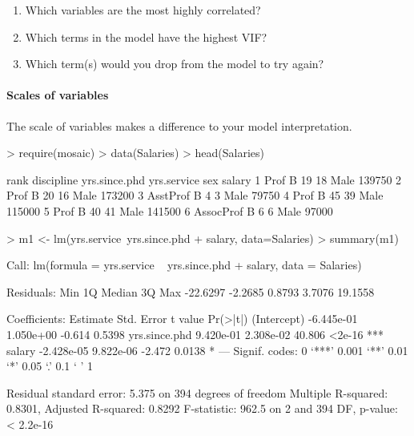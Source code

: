 \documentclass[10pt]{article}
\begin{document}
\begin{enumerate}
  \itemsep0.5in
  \item Which variables are the most highly correlated?
  \item Which terms in the model have the highest VIF?
  \item Which term(s) would you drop from the model to try again?
  \vspace{0.5in}
\end{enumerate}

\paragraph{Scales of variables}
The scale of variables makes a difference to your model interpretation. 

\begin{Schunk}
\begin{Sinput}
> require(mosaic)
> data(Salaries)
> head(Salaries)
\end{Sinput}
\begin{Soutput}
       rank discipline yrs.since.phd yrs.service  sex salary
1      Prof          B            19          18 Male 139750
2      Prof          B            20          16 Male 173200
3  AsstProf          B             4           3 Male  79750
4      Prof          B            45          39 Male 115000
5      Prof          B            40          41 Male 141500
6 AssocProf          B             6           6 Male  97000
\end{Soutput}
\begin{Sinput}
> m1 <- lm(yrs.service~yrs.since.phd + salary, data=Salaries)
> summary(m1)
\end{Sinput}
\begin{Soutput}
Call:
lm(formula = yrs.service ~ yrs.since.phd + salary, data = Salaries)

Residuals:
     Min       1Q   Median       3Q      Max 
-22.6297  -2.2685   0.8793   3.7076  19.1558 

Coefficients:
                Estimate Std. Error t value Pr(>|t|)    
(Intercept)   -6.445e-01  1.050e+00  -0.614   0.5398    
yrs.since.phd  9.420e-01  2.308e-02  40.806   <2e-16 ***
salary        -2.428e-05  9.822e-06  -2.472   0.0138 *  
---
Signif. codes:  0 ‘***’ 0.001 ‘**’ 0.01 ‘*’ 0.05 ‘.’ 0.1 ‘ ’ 1

Residual standard error: 5.375 on 394 degrees of freedom
Multiple R-squared:  0.8301,	Adjusted R-squared:  0.8292 
F-statistic: 962.5 on 2 and 394 DF,  p-value: < 2.2e-16
\end{Soutput}
\end{Schunk}
\end{document}

